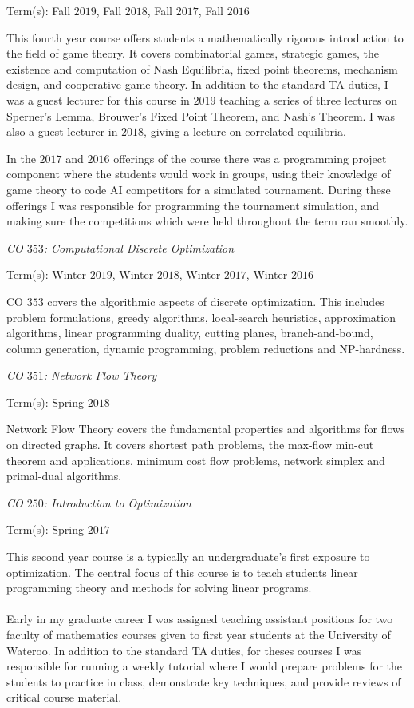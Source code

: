 \documentclass{article}
\begin{document}
Term(s): Fall $2019$, Fall $2018$, Fall $2017$, Fall $2016$

This fourth year course offers students a mathematically rigorous introduction to the field of game theory. It covers combinatorial games, strategic games, the existence and computation of Nash Equilibria, fixed point theorems, mechanism design, and cooperative game theory. In addition to the standard TA duties, I was a guest lecturer for this course in $2019$ teaching a series of three lectures on Sperner's Lemma, Brouwer's Fixed Point Theorem, and Nash's Theorem. I was also a guest lecturer in $2018$, giving a lecture on correlated equilibria. 

In the $2017$ and $2016$ offerings of the course there was a programming project component where the students would work in groups, using their knowledge of game theory to code AI competitors for a simulated tournament. During these offerings I was responsible for programming the tournament simulation, and making sure the competitions which were held throughout the term ran smoothly.
\bigskip

\noindent\emph{CO $353$: Computational Discrete Optimization}

Term(s): Winter $2019$, Winter $2018$, Winter $2017$, Winter $2016$

CO $353$ covers the algorithmic aspects of discrete optimization. This includes problem formulations, greedy algorithms, local-search heuristics, approximation algorithms, linear programming duality, cutting planes, branch-and-bound, column generation, dynamic programming, problem reductions and NP-hardness.
\bigskip

\noindent\emph{CO $351$: Network Flow Theory}

Term(s): Spring $2018$

Network Flow Theory covers the fundamental properties and algorithms for flows on directed graphs. It covers shortest path problems, the max-flow min-cut theorem and applications, minimum cost flow problems, network simplex and primal-dual algorithms.
\bigskip

\noindent\emph{CO $250$: Introduction to Optimization}

Term(s): Spring $2017$

This second year course is a typically an undergraduate's first exposure to optimization. The central focus of this course is to teach students linear programming theory and methods for solving linear programs.

\paragraph{}
Early in my graduate career I was assigned teaching assistant positions for two faculty of mathematics courses given to first year students at the University of Wateroo. In addition to the standard TA duties, for theses courses I was responsible for running a weekly tutorial where I would prepare problems for the students to practice in class, demonstrate key techniques, and provide reviews of critical course material.
\bigskip
\end{document}
